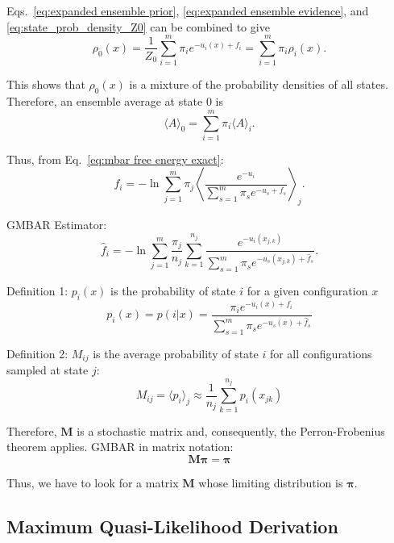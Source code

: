 \documentclass[aip,jcp,preprint,amsmath,amssymb]{revtex4-1}
\newcommand{\mt}[1]{\boldsymbol{\mathbf{#1}}}           %
\newcommand{\vt}[1]{\boldsymbol{\mathbf{#1}}}           %
\begin{document}
Eqs.~\eqref{eq:expanded ensemble prior}, \eqref{eq:expanded ensemble evidence}, and \eqref{eq:state_prob_density_Z0} can be combined to give
\begin{equation*}
\rho_0(x) = \frac{1}{Z_0} \sum_{i=1}^m \pi_i e^{-u_i(x) + f_i} = \sum_{i=1}^m \pi_i \rho_i(x).
\end{equation*}

This shows that $\rho_0(x)$ is a mixture of the probability densities of all states. Therefore, an ensemble average at state $0$ is
\begin{equation*}
\langle A \rangle_0 = \sum_{i=1}^m \pi_i \langle A \rangle_i.
\end{equation*}

Thus, from Eq.~\eqref{eq:mbar free energy exact}:
\begin{equation}
f_i = -\ln \sum_{j=1}^m \pi_j \left\langle \frac{e^{-u_i}}{\sum_{s=1}^m \pi_s e^{-u_s + f_s}} \right\rangle_j.
\end{equation}

GMBAR Estimator:
\begin{equation}
\hat f_i = -\ln \sum_{j=1}^m \frac{\pi_j}{n_j} \sum_{k=1}^{n_j} \frac{e^{-u_i(x_{j,k})}}{\sum_{s=1}^m \pi_s e^{-u_s(x_{j,k}) + \hat f_s}}.
\end{equation}


Definition 1: $p_i(x)$ is the probability of state $i$ for a given configuration $x$
\begin{equation}
p_i(x) = p(i|x) = \frac{\pi_i e^{-u_i(x) + f_i}}{\sum_{s=1}^m \pi_s e^{-u_s(x) + \hat f_s}}
\end{equation}

Definition 2: $M_{ij}$ is the average probability of state $i$ for all configurations sampled at state $j$:
\begin{equation*}
M_{ij} = \langle p_i \rangle_j \approx \frac{1}{n_j} \sum_{k=1}^{n_j} p_i(x_{jk})
\end{equation*}

Therefore, $\vt M$ is a stochastic matrix and, consequently, the Perron-Frobenius theorem applies. GMBAR in matrix notation:
\begin{equation*}
\mt M \vt \pi = \vt \pi
\end{equation*}

Thus, we have to look for a matrix $\mt M$ whose limiting distribution is $\vt \pi$.

\subsection{Maximum Quasi-Likelihood Derivation}
\end{document}
